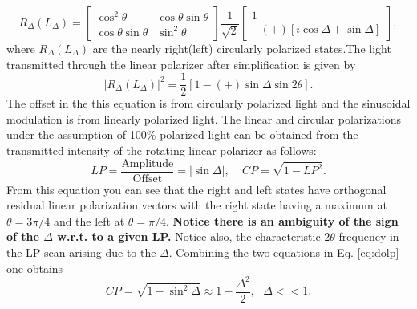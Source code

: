 \documentclass[12pt]{article}
\begin{document}
\begin{equation}
\label{eq:jones}
R_\Delta(L_\Delta)=
\begin{bmatrix}
\cos^2\theta & \cos\theta\sin\theta\\
\cos\theta\sin\theta & \sin^2\theta
\end{bmatrix}
\frac{1}{\sqrt{2}}
\begin{bmatrix}
1\\
-(+)[i\cos\Delta+\sin\Delta]
\end{bmatrix},
\end{equation}
where $R_\Delta(L_\Delta)$ are the nearly right(left) circularly polarized states.The light transmitted through the linear polarizer after simplification is given by
\begin{equation}
\left| R_\Delta(L_\Delta)\right|^2= \frac{1}{2}\left[1-(+)\sin\Delta\sin2\theta\right].
\end{equation}
The offset in the this equation is from circularly polarized light and the sinusoidal modulation is from linearly polarized light. The linear and circular polarizations under the assumption of 100\% polarized light can be obtained from the transmitted intensity of the rotating linear polarizer as follows: 
\begin{equation}
\label{eq:dolp}
LP = \frac{\textrm{Amplitude}}{\textrm{Offset}}=\left|\sin\Delta\right|, ~~~~~CP = \sqrt{1-LP^2}.
\end{equation}
From this equation you can see that the right and left states have orthogonal residual linear polarization vectors with the right state having a maximum at $\theta=3\pi/4$ and the left at $\theta=\pi/4$. \textbf{Notice there is an ambiguity of the sign of the $\Delta$ w.r.t. to a given LP.} Notice also, the characteristic $2\theta$ frequency in the LP scan arising due to the $\Delta$. Combining the two equations in Eq. \ref{eq:dolp} one obtains 
\begin{equation}
\label{eq:docp}
CP = \sqrt{1-\sin^2\Delta}\approx1-\frac{\Delta^2}{2}, ~~~\Delta<<1.
\end{equation}
\end{document}
